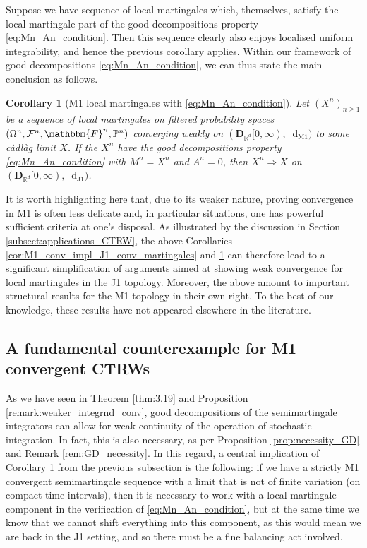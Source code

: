 \documentclass[11pt]{article}
\newtheorem{cor}[theorem]{Corollary}
\theoremstyle{definition}\newtheorem{example}[theorem]{Example}
\theoremstyle{definition}\newtheorem{counterexample}[theorem]{Counterexample}
\theoremstyle{definition}\newtheorem{remark}[theorem]{Remark}
\theoremstyle{definition}\newtheorem{defi}[theorem]{Definition}
\numberwithin{equation}{section}
\newcommand*\diff{\mathop{}\!\mathrm{d}}								%
\newcommand{\Pro}{\mathbb{P}}										%
\renewcommand{\|}{\; : \, \;}											%
\newcommand{\dJ}{\diff_{\operatorname{J1}}}								%
\newcommand{\dM}{\diff_{\operatorname{M1}}}							%
\begin{document}
Suppose we have sequence of local martingales which, themselves, satisfy the local martingale part of the good decompositions property \eqref{eq:Mn_An_condition}. Then this sequence clearly also enjoys localised uniform integrability, and hence the previous corollary applies. Within our framework of good decompositions \eqref{eq:Mn_An_condition}, we can thus state the main conclusion as follows.

\begin{cor}[M1 local martingales with \eqref{eq:Mn_An_condition}] \label{cor:M1_conv_impl_J1_conv_martingales_under_GD}
	Let $(X^n)_{n\ge 1}$ be a sequence of local martingales on filtered probability spaces $(\Omega^n, \mathcal{F}^n, \mathbbm{F}^n, \Pro^n)$ converging weakly on $(\mathbf{D}_{\mathbb{R}^d}[0,\infty), \dM)$ to some càdlàg limit $X$. If the $X^n$ have the good decompositions property \eqref{eq:Mn_An_condition} with $M^n=X^n$ and $A^n=0$, then $X^n \Rightarrow X$ on $(\mathbf{D}_{\mathbb{R}^d}[0,\infty), \dJ)$.
\end{cor}

It is worth highlighting here that, due to its weaker nature, proving convergence in M1 is often less delicate and, in particular situations, one has powerful sufficient criteria at one's disposal. As illustrated by the discussion in Section \ref{subsect:applications_CTRW}, the above Corollaries \ref{cor:M1_conv_impl_J1_conv_martingales} and \ref{cor:M1_conv_impl_J1_conv_martingales_under_GD} can therefore lead to a significant simplification of arguments aimed at showing weak convergence for local martingales in the J1 topology. Moreover, the above amount to important structural results for the M1 topology in their own right. To the best of our knowledge, these results have not appeared elsewhere in the literature.


\subsection{A fundamental counterexample for M1 convergent CTRWs}\label{sect:counter}

As we have seen in Theorem \ref{thm:3.19} and Proposition \ref{remark:weaker_integrnd_conv}, good decompositions of the semimartingale integrators can allow for weak continuity of the operation of stochastic integration. In fact, this is also necessary, as per Proposition \ref{prop:necessity_GD} and Remark \ref{rem:GD_necessity}. In this regard, a central implication of Corollary \ref{cor:M1_conv_impl_J1_conv_martingales_under_GD} from the previous subsection is the following: if we have a strictly M1 convergent semimartingale sequence with a limit that is not of finite variation (on compact time intervals), then it is necessary to work with a local martingale component in the verification of \eqref{eq:Mn_An_condition}, but at the same time we know that we cannot shift everything into this component, as this would mean we are back in the J1 setting, and so there must be a fine balancing act involved.
\end{document}
